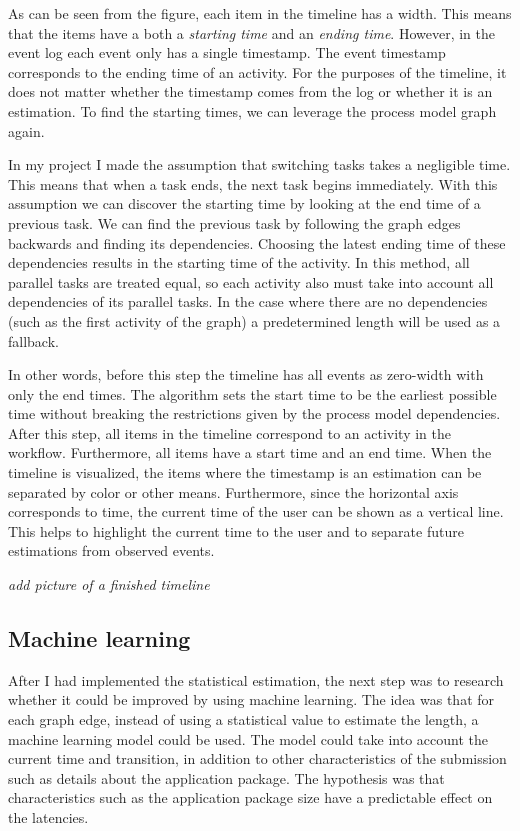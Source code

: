 \documentclass[english,12pt,a4paper,pdftex,sci,utf8]{aaltothesis}
\theoremstyle{definition}
\newcommand{\nyi}[1]{\noindent\colorbox{nyibg}{\textcolor{nyitext}{\emph{#1}}}}
\begin{document}
As can be seen from the figure, each item in the timeline has a width.
This means that the items have a both a \textit{starting time} and an \textit{ending time}.
However, in the event log each event only has a single timestamp.
The event timestamp corresponds to the ending time of an activity.
For the purposes of the timeline, it does not matter whether the timestamp comes from the log or whether it is an estimation.
To find the starting times, we can leverage the process model graph again.

In my project I made the assumption that switching tasks takes a negligible time.
This means that when a task ends, the next task begins immediately.
With this assumption we can discover the starting time by looking at the end time of a previous task.
We can find the previous task by following the graph edges backwards and finding its dependencies.
Choosing the latest ending time of these dependencies results in the starting time of the activity.
In this method, all parallel tasks are treated equal, so each activity also must take into account all dependencies of its parallel tasks.
In the case where there are no dependencies (such as the first activity of the graph) a predetermined length will be used as a fallback.

In other words, before this step the timeline has all events as zero-width with only the end times. The algorithm sets the start time to be the earliest possible time without breaking the restrictions given by the process model dependencies.
After this step, all items in the timeline correspond to an activity in the workflow. Furthermore, all items have a start time and an end time.
When the timeline is visualized, the items where the timestamp is an estimation can be separated by color or other means.
Furthermore, since the horizontal axis corresponds to time, the current time of the user can be shown as a vertical line.
This helps to highlight the current time to the user and to separate future estimations from observed events.

\nyi{add picture of a finished timeline}

\subsection{Machine learning}
\label{sec:ml-estimation}

After I had implemented the statistical estimation, the next step was to research whether it could be improved by using machine learning. 
The idea was that for each graph edge, instead of using a statistical value to estimate the length, a machine learning model could be used.
The model could take into account the current time and transition, in addition to other characteristics of the submission such as details about the application package.
The hypothesis was that characteristics such as the application package size have a predictable effect on the latencies.
\end{document}
